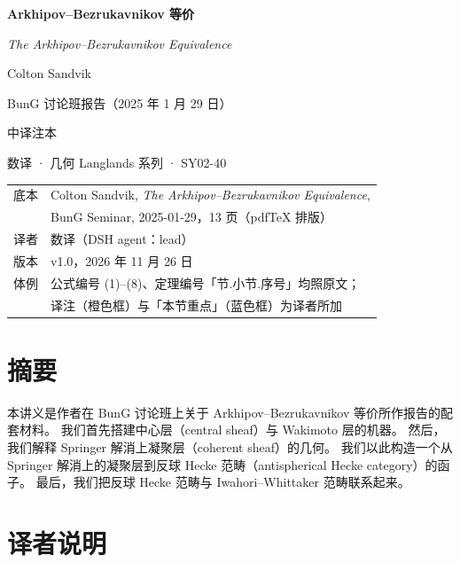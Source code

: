 \begin{titlepage}
\centering
\vspace*{3.2cm}
{\Huge\bfseries Arkhipov–Bezrukavnikov 等价\par}
\vspace{0.9em}
{\large\itshape The Arkhipov–Bezrukavnikov Equivalence\par}
\vspace{2.4em}
{\large Colton Sandvik\par}
\vspace{0.4em}
{\normalsize BunG 讨论班报告（2025 年 1 月 29 日）\par}
\vspace{3.0em}
{\large 中译注本\par}
\vspace{0.6em}
{\normalsize 数译 · 几何 Langlands 系列 · SY02-40\par}
\vfill
{\small
\begin{tabular}{@{}rl@{}}
底本 & Colton Sandvik, \emph{The Arkhipov–Bezrukavnikov Equivalence},\\
     & BunG Seminar, 2025-01-29，13 页（pdfTeX 排版）\\
译者 & 数译（DSH agent：lead）\\
版本 & v1.0，2026 年 11 月 26 日\\
体例 & 公式编号 (1)–(8)、定理编号「节.小节.序号」均照原文；\\
     & 译注（橙色框）与「本节重点」（蓝色框）为译者所加\\
\end{tabular}}
\end{titlepage}

\section*{摘要}

本讲义是作者在 BunG 讨论班上关于 Arkhipov–Bezrukavnikov 等价所作报告的配套材料。
我们首先搭建中心层（central sheaf）与 Wakimoto 层的机器。
然后，我们解释 Springer 解消上凝聚层（coherent sheaf）的几何。
我们以此构造一个从 Springer 解消上的凝聚层到反球 Hecke 范畴（antispherical Hecke category）的函子。
最后，我们把反球 Hecke 范畴与 Iwahori–Whittaker 范畴联系起来。

\section*{译者说明}

